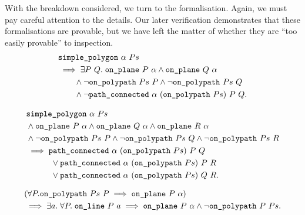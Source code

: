 With the breakdown considered, we turn to the formalisation. Again, we must pay careful attention to the details. Our later verification demonstrates that these formalisations are provable, but we have left the matter of whether they are ``too easily provable'' to inspection.
\begin{equation}\label{eq:jordanFormal1}
  \begin{split}
    &\code{simple\_polygon}\ \alpha\ Ps\\
    &\implies \exists P\ Q.\; \code{on\_plane}\ P\ \alpha \wedge \code{on\_plane}\ Q\ \alpha\\
    &\qquad\wedge \neg\code{on\_polypath}\ Ps\ P \wedge \neg\code{on\_polypath}\ Ps\ Q\\
    &\qquad\wedge \neg\code{path\_connected}\ \alpha\ (\code{on\_polypath}\ Ps)\ P\ Q.
  \end{split}
\end{equation}

\begin{equation}\label{eq:jordanFormal2}
  \begin{split}
  &\code{simple\_polygon}\ \alpha\ Ps\\
  &\wedge \code{on\_plane}\ P\ \alpha \wedge \code{on\_plane}\ Q\ \alpha \wedge \code{on\_plane}\ R\ \alpha\\
  &\wedge \neg\code{on\_polypath}\ Ps\ P\wedge \neg\code{on\_polypath}\ Ps\ Q\wedge \neg\code{on\_polypath}\ Ps\ R\\
  &\implies \code{path\_connected}\ \alpha\ (\code{on\_polypath}\ Ps)\ P\ Q\\
  &\qquad\quad\vee \code{path\_connected}\ \alpha\ (\code{on\_polypath}\ Ps)\ P\ R\\
  &\qquad\quad\vee \code{path\_connected}\ \alpha\ (\code{on\_polypath}\ Ps)\ Q\ R.
     \end{split}
\end{equation}

\begin{equation}
  \begin{split}\label{eq:jordanFormal3}
  &(\forall P. \code{on\_polypath}\ Ps\ P \implies \code{on\_plane}\ P\ \alpha)\\
  &\implies \exists a.\; \forall P.\; \code{on\_line}\ P\ a \implies \code{on\_plane}\ P\ \alpha
  \wedge \neg\code{on\_polypath}\ P\ Ps.
     \end{split}
\end{equation}

